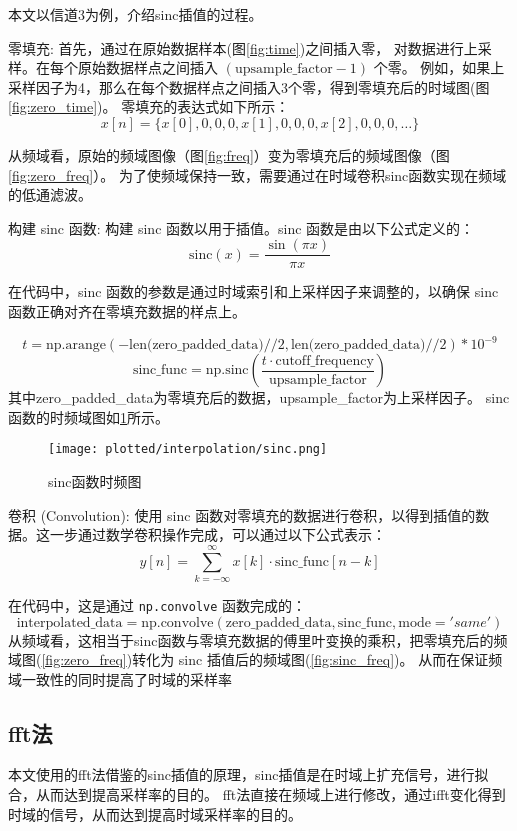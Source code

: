 本文以信道3为例，介绍sinc插值的过程。

零填充:
首先，通过在原始数据样本(图\ref{fig:time})之间插入零，
对数据进行上采样。在每个原始数据样点之间插入 \( ( \text{upsample\_factor} - 1) \) 个零。
例如，如果上采样因子为4，那么在每个数据样点之间插入3个零，得到零填充后的时域图(图\ref{fig:zero_time})。
零填充的表达式如下所示：
\[
    x[n] = \{x[0], 0, 0, 0, x[1], 0, 0, 0, x[2], 0, 0, 0, \ldots\}
\]

从频域看，原始的频域图像（图\ref{fig:freq}）变为零填充后的频域图像（图\ref{fig:zero_freq}）。
为了使频域保持一致，需要通过在时域卷积sinc函数实现在频域的低通滤波。

构建 sinc 函数:
构建 sinc 函数以用于插值。sinc 函数是由以下公式定义的：
\[
    \text{sinc}(x) = \dfrac{\sin(\pi x)}{\pi x}
\]

在代码中，sinc 函数的参数是通过时域索引和上采样因子来调整的，以确保 sinc 函数正确对齐在零填充数据的样点上。

\[
    t = \text{np.arange}(-\text{len(zero\_padded\_data)}//2, \text{len(zero\_padded\_data)}//2) * 10^{-9}
\]
\[
    \text{sinc\_func} = \text{np.sinc}(\frac{t \cdot \text{cutoff\_frequency}}{\text{upsample\_factor} })
\]
其中zero\_padded\_data为零填充后的数据，upsample\_factor为上采样因子。
sinc函数的时频域图如\ref{fig:sinc}所示。
\begin{figure}[htbp]
    \centering
    \texttt{[image: plotted/interpolation/sinc.png]}
    \caption{\label{fig:sinc}sinc函数时频图}
\end{figure}

卷积 (Convolution):
使用 sinc 函数对零填充的数据进行卷积，以得到插值的数据。这一步通过数学卷积操作完成，可以通过以下公式表示：
\[
    y[n] = \sum_{k=-\infty}^{\infty} x[k] \cdot \text{sinc\_func}[n - k]
\]

在代码中，这是通过 \texttt{np.convolve} 函数完成的：
\[
    \text{interpolated\_data} = \text{np.convolve}(\text{zero\_padded\_data}, \text{sinc\_func}, \text{mode}='same')
\]
从频域看，这相当于sinc函数与零填充数据的傅里叶变换的乘积，把零填充后的频域图(\ref{fig:zero_freq})转化为 sinc 插值后的频域图(\ref{fig:sinc_freq})。
从而在保证频域一致性的同时提高了时域的采样率

\subsection{fft法}
本文使用的fft法借鉴的sinc插值的原理，sinc插值是在时域上扩充信号，进行拟合，从而达到提高采样率的目的。
fft法直接在频域上进行修改，通过ifft变化得到时域的信号，从而达到提高时域采样率的目的。

